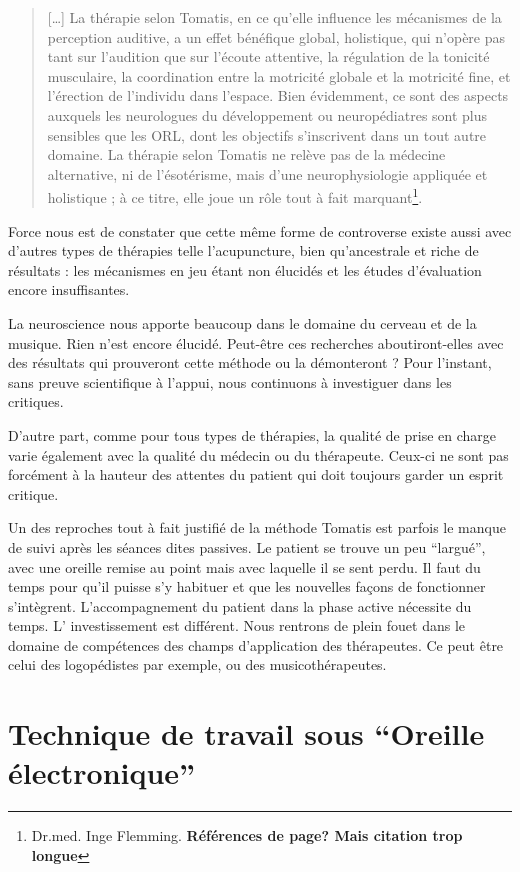 \begin{quotation}
[\ldots] La thérapie selon Tomatis, en ce qu'elle influence les mécanismes
de la perception auditive, a un effet bénéfique global, holistique,
qui n'opère pas tant sur l'audition que sur l'écoute attentive, la
régulation de la tonicité musculaire, la coordination entre la motricité
globale et la motricité fine, et l'érection de l'individu dans l'espace.
Bien évidemment, ce sont des aspects auxquels les neurologues du développement
ou neuropédiatres sont plus sensibles que les ORL, dont les objectifs
s'inscrivent dans un tout autre domaine. La thérapie selon Tomatis
ne relève pas de la médecine alternative, ni de l'ésotérisme, mais
d'une neurophysiologie appliquée et holistique ; à ce titre, elle
joue un rôle tout à fait marquant\footnote{Dr.med. Inge Flemming. \textbf{Références de page? Mais citation trop longue}}.
\end{quotation}
Force nous est de constater que cette même forme de controverse existe
aussi avec d'autres types de thérapies telle l'acupuncture, bien qu'ancestrale
et riche de résultats : les mécanismes en jeu étant non élucidés et
les études d'évaluation encore insuffisantes. 

La neuroscience nous apporte beaucoup dans le domaine du cerveau et
de la musique. Rien n'est encore élucidé. Peut-être ces recherches
aboutiront-elles avec des résultats qui prouveront cette méthode ou
la démonteront ? Pour l'instant, sans preuve scientifique à l'appui,
nous continuons à investiguer dans les critiques.

D'autre part, comme pour tous types de thérapies, la qualité de prise
en charge varie également avec la qualité du médecin ou du thérapeute.
Ceux-ci ne sont pas forcément à la hauteur des attentes du patient
qui doit toujours garder un esprit critique.

Un des reproches tout à fait justifié de la méthode Tomatis est parfois
le manque de suivi après les séances dites passives. Le patient se trouve un peu ``largué'', avec
une oreille remise au point mais avec laquelle il se sent perdu. 
Il
faut du temps pour qu'il puisse s'y habituer et que les nouvelles
façons de fonctionner s'intègrent. L'accompagnement du patient dans
la phase active nécessite du temps. L' investissement est différent.
Nous rentrons de plein fouet dans le domaine de compétences des champs
d'application des thérapeutes. Ce peut être celui des logopédistes
par exemple, ou des musicothérapeutes.

\section{Technique de travail sous ``Oreille électronique''}

